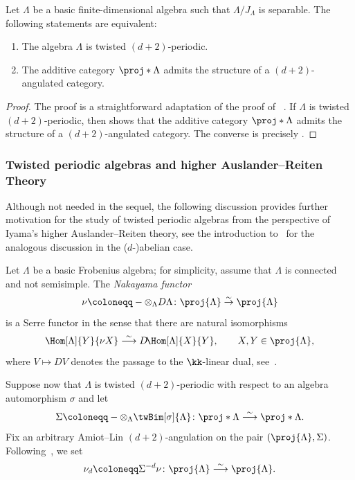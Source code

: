 \documentclass[a4paper]{amsart}
\begin{document}
\begin{theorem}
  \label{thm:d-Hanihara}
  Let $\Lambda$ be a basic finite-dimensional algebra such that
  $\Lambda/J_\Lambda$ is separable. The following statements are equivalent:
  \begin{enumerate}
  \item The algebra $\Lambda$ is twisted $(d+2)$-periodic.
  \item The additive category $\proj*{\Lambda}$ admits the structure of a
    $(d+2)$-angulated category.
  \end{enumerate}
\end{theorem}
\begin{proof}
  The proof is a straightforward adaptation of the proof of
  ~\cite[Thm.~1.2]{Han20}. If $\Lambda$ is twisted $(d+2)$-periodic, then
   shows that the additive category $\proj*{\Lambda}$ admits
  the structure of a $(d+2)$-angulated category. The converse is precisely
  .
\end{proof}

\subsubsection{Twisted periodic algebras and higher Auslander--Reiten Theory}

Although not needed in the sequel, the following discussion provides further
motivation for the study of twisted periodic algebras from the perspective of
Iyama's higher Auslander--Reiten theory, see the introduction to~\cite{Iya07}
for the analogous discussion in the ($d$-)abelian case.

Let $\Lambda$ be a basic Frobenius
algebra; for simplicity, assume that $\Lambda$ is connected and not semisimple. The \emph{Nakayama functor}
\[
  \nu\coloneqq-\otimes_\Lambda
  D\Lambda\colon\proj{\Lambda}\stackrel{\sim}{\to}\proj{\Lambda}
\]
is a Serre functor in the sense that there are natural isomorphisms
\[
  \Hom[\Lambda]{Y}{\nu
    X}\stackrel{\sim}{\longrightarrow}D\!\Hom[\Lambda]{X}{Y},\qquad
  X,Y\in\proj{\Lambda},
\]
where $V\mapsto DV$ denotes the passage to the $\kk$-linear dual,
see~\cite[Def.~1.2]{BO01}.

Suppose now that $\Lambda$ is twisted
$(d+2)$-periodic with respect to an algebra automorphism $\sigma$ and let
\[
  \Sigma\coloneqq-\otimes_\Lambda\twBim[\sigma]{\Lambda}\colon\proj*{\Lambda}\stackrel{\sim}{\longrightarrow}\proj*{\Lambda}.
\]
Fix an arbitrary Amiot--Lin $(d+2)$-angulation on the pair
$(\proj{\Lambda},\Sigma)$. Following~\cite{IY08}, we set
\[
  \nu_d\coloneqq
  \Sigma^{-d}\nu\colon\proj{\Lambda}\stackrel{\sim}{\longrightarrow}\proj{\Lambda}.
\]
\end{document}
